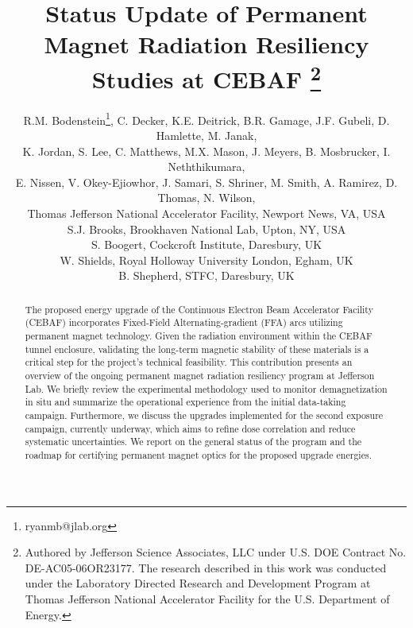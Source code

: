 \documentclass[a4paper,
               ]{jacow}
\begin{document}
\title{Status Update of Permanent Magnet Radiation Resiliency Studies at CEBAF%
\thanks{Authored by Jefferson Science Associates, LLC under U.S. DOE Contract No. DE-AC05-06OR23177. The research described in this work was conducted under the Laboratory Directed Research and Development Program at Thomas Jefferson National Accelerator Facility for the U.S. Department of Energy.}}

\author{R.M. Bodenstein\thanks{ryanmb@jlab.org}, C. Decker, K.E. Deitrick, B.R. Gamage, J.F. Gubeli, D. Hamlette, M. Janak,\\ K. Jordan, S. Lee, C. Matthews, M.X. Mason, J. Meyers, B. Mosbrucker, I. Neththikumara,\\  E. Nissen, V. Okey-Ejiowhor, J. Samari, S. Shriner, M. Smith, A. Ramirez, D. Thomas, N. Wilson,\\ Thomas Jefferson National Accelerator Facility, Newport News, VA, USA \\
S.J. Brooks, Brookhaven National Lab, Upton, NY, USA \\
S. Boogert, Cockcroft Institute, Daresbury, UK\\
W. Shields, Royal Holloway University London, Egham, UK\\
B. Shepherd, STFC, Daresbury, UK
    }

\maketitle

%
\begin{abstract}
The proposed energy upgrade of the Continuous Electron Beam Accelerator Facility (CEBAF) incorporates Fixed-Field Alternating-gradient (FFA) arcs utilizing permanent magnet technology. Given the radiation environment within the CEBAF tunnel enclosure, validating the long-term magnetic stability of these materials is a critical step for the project's technical feasibility. This contribution presents an overview of the ongoing permanent magnet radiation resiliency program at Jefferson Lab. We briefly review the experimental methodology used to monitor demagnetization in situ and summarize the operational experience from the initial data-taking campaign. Furthermore, we discuss the upgrades implemented for the second exposure campaign, currently underway, which aims to refine dose correlation and reduce systematic uncertainties. We report on the general status of the program and the roadmap for certifying permanent magnet optics for the proposed upgrade energies.
\end{abstract}
\end{document}
